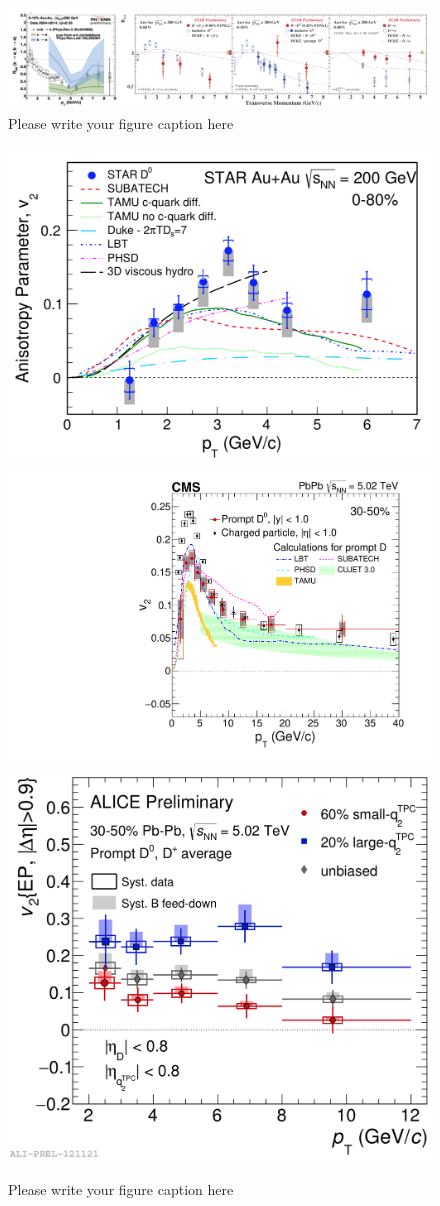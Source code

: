 \documentclass{webofc}
\begin{document}
\begin{figure}[ht]
\centering
\includegraphics[width=.95\textwidth]{Plots/BPHENIXAuAu}
\caption{Please write your figure caption here}
\label{FlavourRAAPHENIX}
\end{figure}

\begin{figure}[ht]
\centering
\includegraphics[width=.40\textwidth]{Plots/Dmesonv2STAR}
\includegraphics[width=.29\textwidth]{Plots/Dv2CMS3050.pdf}
\includegraphics[width=.29\textwidth]{Plots/DmesonEventShapeALICEPbPb}
\caption{Please write your figure caption here}
\label{Dvn}     
\end{figure}
\end{document}
